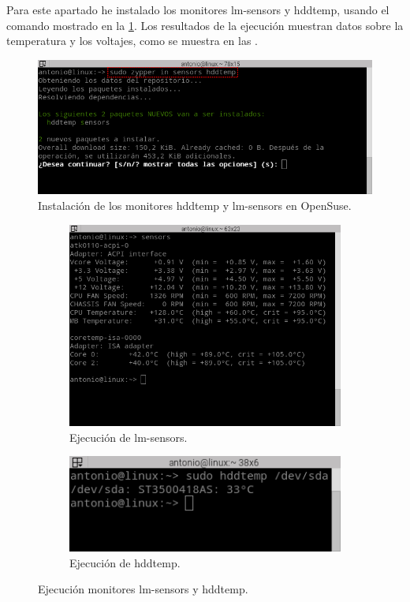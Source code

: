 Para este apartado he instalado los monitores lm-sensors y hddtemp, usando el comando mostrado en la \cref{fig13}. Los resultados de la ejecución muestran datos sobre la temperatura y los voltajes, como se muestra en las .

\begin{figure}[H]
  \begin{center}
    \includegraphics[width=1\textwidth]{imagenes/sensors}
    \caption{Instalación de los monitores hddtemp y lm-sensors en OpenSuse.}
    \label{fig13}
  \end{center}
\end{figure}

\begin{figure}[H]
    \centering
    \begin{subfigure}[b]{0.55\textwidth}
        \includegraphics[width=\textwidth]{imagenes/sensors2}
        \caption{Ejecución de lm-sensors.}
        \label{fig14}
    \end{subfigure}
    \begin{subfigure}[b]{0.4\textwidth}
        \includegraphics[width=\textwidth]{imagenes/hddtemp}
        \caption{Ejecución de hddtemp.}
        \label{fig15}
    \end{subfigure}
    \caption{Ejecución monitores lm-sensors y hddtemp.}
\end{figure}

